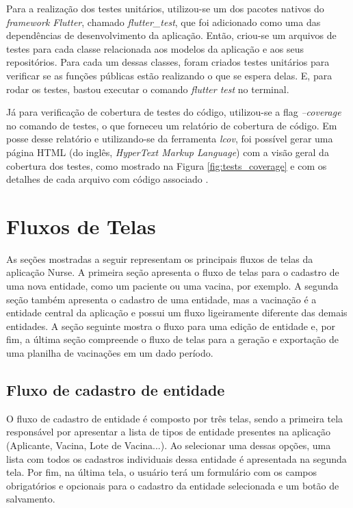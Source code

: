 Para a realização dos testes unitários, utilizou-se um dos pacotes nativos do \textit{framework Flutter}, chamado \textit{flutter\_test}, que foi adicionado como uma das dependências de desenvolvimento da aplicação. Então, criou-se um arquivos de testes para cada classe relacionada aos modelos da aplicação e aos seus repositórios. Para cada um dessas classes, foram criados testes unitários para verificar se as funções públicas estão realizando o que se espera delas. E, para rodar os testes, bastou executar o comando \textit{flutter test} no terminal.

Já para verificação de cobertura de testes do código, utilizou-se a flag \textit{--coverage} no comando de testes, o que forneceu um relatório de cobertura de código. Em posse desse relatório e utilizando-se da ferramenta \textit{lcov}, foi possível gerar uma página HTML (do inglês, \textit{HyperText Markup Language}) com a visão geral da cobertura dos testes, como mostrado na Figura \ref{fig:tests_coverage} e com os detalhes de cada arquivo com código associado \cite{lcov}.


\section{Fluxos de Telas}
\label{cap5:Sec:FluxosTelas}
As seções mostradas a seguir representam os principais fluxos de telas da aplicação Nurse. A primeira seção apresenta o fluxo de telas para o cadastro de uma nova entidade, como um paciente ou uma vacina, por exemplo. A segunda seção também apresenta o cadastro de uma entidade, mas a vacinação é a entidade central da aplicação e possui um fluxo ligeiramente diferente das demais entidades. A seção seguinte mostra o fluxo para uma edição de entidade e, por fim, a última seção compreende o fluxo de telas para a geração e exportação de uma planilha de vacinações em um dado período. 

\subsection{Fluxo de cadastro de entidade}
\label{cap5:SubSec:FluxoCadastroEntidade}
O fluxo de cadastro de entidade é composto por três telas, sendo a primeira tela responsável por apresentar a lista de tipos de entidade presentes na aplicação (Aplicante, Vacina, Lote de Vacina...). Ao selecionar uma dessas opções, uma lista com todos os cadastros individuais dessa entidade é apresentada na segunda tela. Por fim, na última tela, o usuário terá um formulário com os campos obrigatórios e opcionais para o cadastro da entidade selecionada e um botão de salvamento.

